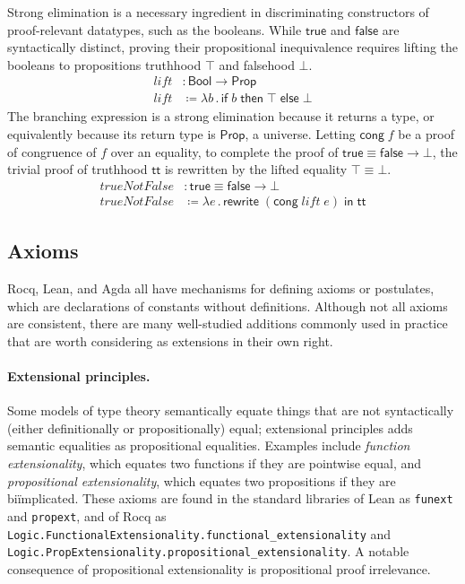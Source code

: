\documentclass{article}
\newcommand{\kw}[1]{\mathsf{#1}}
\newcommand{\code}[1]{\texttt{#1}}
\begin{document}
Strong elimination is a necessary ingredient in discriminating constructors
of proof-relevant datatypes, such as the booleans.
While $\kw{true}$ and $\kw{false}$ are syntactically distinct,
proving their propositional inequivalence requires lifting the booleans
to propositions truthhood $\top$ and falsehood $\bot$.
%
\begin{align*}
  \mathit{lift} &: \kw{Bool} \to \kw{Prop} \\
  \mathit{lift} &\coloneqq \lambda b \mathpunct{.} \kw{if} \; b \; \kw{then} \; \top \; \kw{else} \; \bot
\end{align*}
%
The branching expression is a strong elimination because it returns a type,
or equivalently because its return type is $\kw{Prop}$, a universe.
Letting $\kw{cong} \; f$ be a proof of congruence of $f$ over an equality,
to complete the proof of $\kw{true} \equiv \kw{false} \to \bot$,
the trivial proof of truthhood $\kw{tt}$ is rewritten by the lifted equality $\top \equiv \bot$.
%
\begin{align*}
  \mathit{trueNotFalse} &: \kw{true} \equiv \kw{false} \to \bot \\
  \mathit{trueNotFalse} &\coloneqq \lambda e \mathpunct{.} \kw{rewrite} \; (\kw{cong} \; \textit{lift} \; e) \; \kw{in} \; \kw{tt}
\end{align*}

\subsection{Axioms}

Rocq, Lean, and Agda all have mechanisms for defining axioms or postulates,
which are declarations of constants without definitions.
Although not all axioms are consistent,
there are many well-studied additions commonly used in practice
that are worth considering as extensions in their own right.

\paragraph{Extensional principles.}
Some models of type theory semantically equate things
that are not syntactically (either definitionally or propositionally) equal;
extensional principles adds semantic equalities as propositional equalities.
Examples include \emph{function extensionality},
which equates two functions if they are pointwise equal,
and \emph{propositional extensionality},
which equates two propositions if they are bi\"implicated.
These axioms are found in the standard libraries of Lean as \code{funext} and \code{propext},
and of Rocq as \code{Logic.{\allowbreak}FunctionalExtensionality.{\allowbreak}functional\_{\allowbreak}extensionality}
and \code{Logic.{\allowbreak}PropExtensionality.{\allowbreak}propositional\_{\allowbreak}extensionality}.
A notable consequence of propositional extensionality is propositional proof irrelevance.
\end{document}
